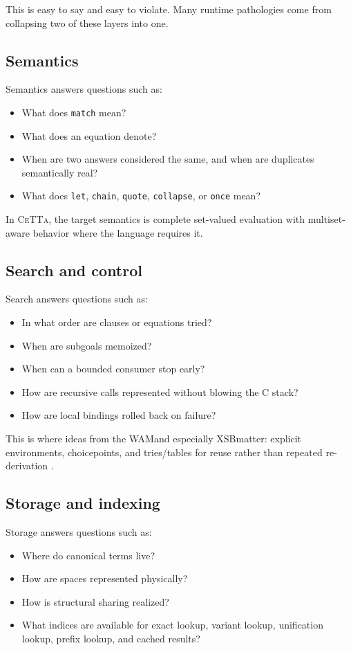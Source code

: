 \documentclass[11pt]{article}
\newcommand{\CeTTa}{\textsc{CeTTa}}
\newcommand{\XSB}{\textsc{XSB}}
\newcommand{\WAM}{\textsc{WAM}}
\begin{document}
This is easy to say and easy to violate. Many runtime pathologies come from collapsing two of these layers into one.

\subsection{Semantics}
Semantics answers questions such as:
\begin{itemize}
    \item What does \texttt{match} mean?
    \item What does an equation denote?
    \item When are two answers considered the same, and when are duplicates semantically real?
    \item What does \texttt{let}, \texttt{chain}, \texttt{quote}, \texttt{collapse}, or \texttt{once} mean?
\end{itemize}

In \CeTTa, the target semantics is complete set-valued evaluation with multiset-aware behavior where the language requires it.

\subsection{Search and control}
Search answers questions such as:
\begin{itemize}
    \item In what order are clauses or equations tried?
    \item When are subgoals memoized?
    \item When can a bounded consumer stop early?
    \item How are recursive calls represented without blowing the C stack?
    \item How are local bindings rolled back on failure?
\end{itemize}

This is where ideas from the \WAM and especially \XSB matter: explicit environments, choicepoints, and tries/tables for reuse rather than repeated re-derivation \cite{xsb_about,xsb_variant,xsb_definite}.

\subsection{Storage and indexing}
Storage answers questions such as:
\begin{itemize}
    \item Where do canonical terms live?
    \item How are spaces represented physically?
    \item How is structural sharing realized?
    \item What indices are available for exact lookup, variant lookup, unification lookup, prefix lookup, and cached results?
\end{itemize}
\end{document}
